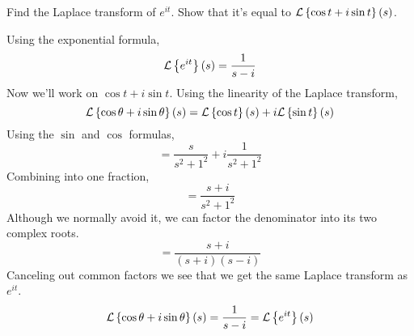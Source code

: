 \begin{example}
	Find the Laplace transform of $e^{it}$. Show that it's equal to $\mathcal{L}\left\{ \cos{t} + i\sin{t} \right\}\left(s\right)$.
\end{example}
Using the exponential formula,
\begin{equation*}
	\mathcal{L}\left\{ e^{it} \right\}\left(s\right) = \frac{1}{s - i}
\end{equation*}
Now we'll work on $\cos{t} + i\sin{t}$. Using the linearity of the Laplace transform,
\begin{equation*}
	\mathcal{L}\left\{ \cos{\theta} + i\sin{\theta} \right\}\left(s\right) = \mathcal{L}\left\{ \cos{t} \right\}\left(s\right) + i\mathcal{L}\left\{ \sin{t} \right\}\left(s\right)
\end{equation*}
Using the $\sin$ and $\cos$ formulas,
\begin{equation*}
	= \frac{s}{s^2 + 1^2} + i\frac{1}{s^2 + 1^2}
\end{equation*}
Combining into one fraction,
\begin{equation*}
	= \frac{s+i}{s^2 + 1^2}
\end{equation*}
Although we normally avoid it, we can factor the denominator into its two complex roots.
\begin{equation*}
	= \frac{s+i}{(s+i)(s-i)}
\end{equation*}
Canceling out common factors we see that we get the same Laplace transform as $e^{it}$.
\begin{equation*}
		\mathcal{L}\left\{ \cos{\theta} + i\sin{\theta} \right\}\left(s\right) = \frac{1}{s-i} = \mathcal{L}\left\{ e^{it} \right\}\left(s\right)
\end{equation*}
